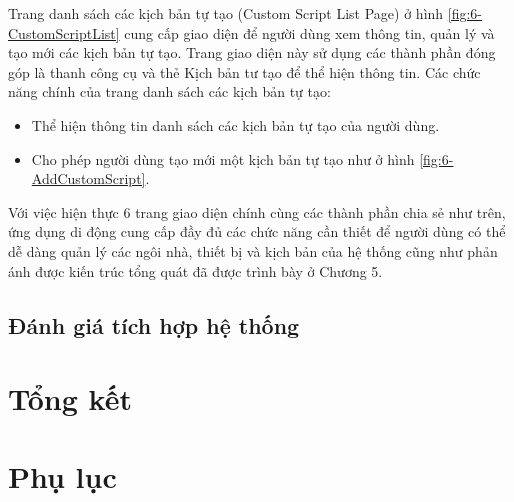 \documentclass[12pt,a4paper,oneside]{extbook}
\begin{document}
Trang danh sách các kịch bản tự tạo (Custom Script List Page) ở hình \ref{fig:6-CustomScriptList} cung cấp giao diện để người dùng xem thông tin, quản lý và tạo mới các kịch bản tự tạo. Trang giao diện này sử dụng các thành phần đóng góp là thanh công cụ và thẻ Kịch bản tư tạo để thể hiện thông tin. Các chức năng chính của trang danh sách các kịch bản tự tạo:

\begin{itemize}[topsep=1mm,itemsep=-0.5mm]
\item Thể hiện thông tin danh sách các kịch bản tự tạo của người dùng.
\item Cho phép người dùng tạo mới một kịch bản tự tạo như ở hình \ref{fig:6-AddCustomScript}.
\vspace{1mm}
\end{itemize}

Với việc hiện thực 6 trang giao diện chính cùng các thành phần chia sẻ như trên, ứng dụng di động cung cấp đầy đủ các chức năng cần thiết để người dùng có thể dễ dàng quản lý các ngôi nhà, thiết bị và kịch bản của hệ thống cũng như phản ánh được kiến trúc tổng quát đã được trình bày ở Chương 5.

\section{Đánh giá tích hợp hệ thống}

\chapter{Tổng kết}

\newpage



\chapter*{Phụ lục}\label{appendix}
\end{document}
